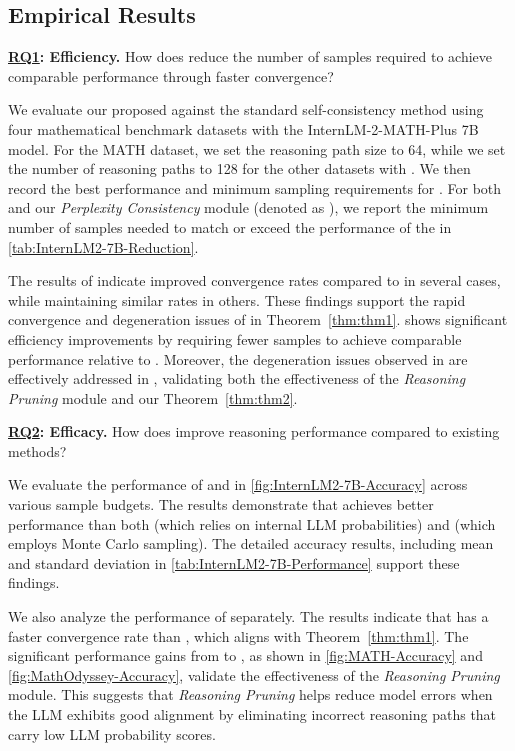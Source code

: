 \subsection{Empirical Results}

\textbf{\underline{RQ1}: Efficiency.} How does \RPC reduce the number of samples required to achieve comparable performance through faster convergence?

We evaluate our proposed \RPC against the standard self-consistency method using four mathematical benchmark datasets with the InternLM-2-MATH-Plus 7B model. For the MATH dataset, we set the reasoning path size to 64, while we set the number of reasoning paths to 128 for the other datasets with \SC. We then record the best performance and minimum sampling requirements for \SC. For both \RPC and our \emph{Perplexity Consistency} module (denoted as \PC), we report the minimum number of samples needed to match or exceed the performance of the \SC in \autoref{tab:InternLM2-7B-Reduction}.

The results of \PC indicate improved convergence rates compared to \SC in several cases, while maintaining similar rates in others. These findings support the rapid convergence and degeneration issues of \PC in Theorem~\ref{thm:thm1}. \RPC shows significant efficiency improvements by requiring fewer samples to achieve comparable performance relative to \SC. Moreover, the degeneration issues observed in \PC are effectively addressed in \RPC, validating both the effectiveness of the \emph{Reasoning Pruning} module and our Theorem~\ref{thm:thm2}.


\textbf{\underline{RQ2}: Efficacy.} How does \RPC improve reasoning performance compared to existing methods?

We evaluate the performance of \PC and \RPC in \autoref{fig:InternLM2-7B-Accuracy} across various sample budgets. The results demonstrate that \RPC achieves better performance than both \PP (which relies on internal LLM probabilities) and \SC (which employs Monte Carlo sampling). The detailed accuracy results, including mean and standard deviation in \autoref{tab:InternLM2-7B-Performance} support these findings.

We also analyze the performance of \PC separately. The results indicate that \PC has a faster convergence rate than \SC, which aligns with Theorem~\ref{thm:thm1}. The significant performance gains from \PC to \RPC, as shown in \autoref{fig:MATH-Accuracy} and \autoref{fig:MathOdyssey-Accuracy}, validate the effectiveness of the \emph{Reasoning Pruning} module. This suggests that \emph{Reasoning Pruning} helps reduce model errors when the LLM exhibits good alignment by eliminating incorrect reasoning paths that carry low LLM probability scores.


